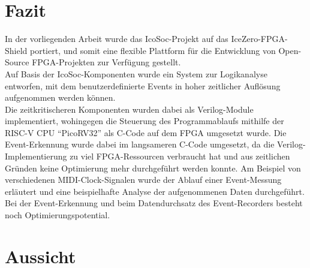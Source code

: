 \chapter{Fazit}
\label{ch:Fazit}
In der vorliegenden Arbeit wurde das IcoSoc-Projekt auf das IceZero-FPGA-Shield portiert, und somit eine flexible Plattform für die Entwicklung von Open-Source FPGA-Projekten zur Verfügung gestellt.\\
Auf Basis der IcoSoc-Komponenten wurde ein System zur Logikanalyse entworfen, mit dem benutzerdefinierte Events in hoher zeitlicher Auflösung aufgenommen werden können.\\
Die zeitkritischeren Komponenten wurden dabei als Verilog-Module implementiert, wohingegen die Steuerung des Programmablaufs mithilfe der RISC-V CPU ``PicoRV32'' als C-Code  auf dem FPGA umgesetzt wurde.
Die Event-Erkennung wurde dabei im langsameren C-Code umgesetzt, da die Verilog-Implementierung zu viel FPGA-Ressourcen verbraucht hat und aus zeitlichen Gründen keine Optimierung mehr durchgeführt werden konnte.
Am Beispiel von verschiedenen MIDI-Clock-Signalen wurde der Ablauf einer Event-Messung erläutert und eine beispielhafte Analyse der aufgenommenen Daten durchgeführt.
Bei der Event-Erkennung und beim Datendurchsatz des Event-Recorders besteht noch Optimierungspotential.
 
\chapter{Aussicht}
\label{ch:Aussicht}

